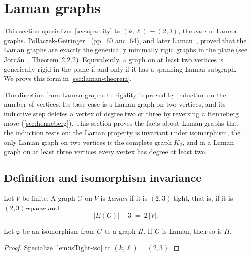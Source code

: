 \section{Laman graphs}
\label{sec:laman}

This section specializes \cref{sec:sparsity} to $(k,\ell) = (2,3)$,
the case of Laman graphs. Pollaczek-Geiringer~\cite{pollaczekGeiringer1927}
(pp.~60 and~64), and later Laman~\cite{laman1970}, proved that the Laman
graphs are exactly the generically minimally rigid graphs in the plane
(see Jord\'an~\cite{jordan2016}, Theorem~2.2.2). Equivalently, a graph
on at least two vertices is generically rigid in the plane if and only
if it has a spanning Laman subgraph. We prove this form in
\cref{sec:laman-theorem}.

The direction from Laman graphs to rigidity is proved by induction on
the number of vertices. Its base case is a Laman graph on two vertices,
and its inductive step deletes a vertex of degree two or three by
reversing a Henneberg move (\cref{sec:henneberg}). This section proves
the facts about Laman graphs that the induction rests on: the Laman
property is invariant under isomorphism, the only Laman graph on two
vertices is the complete graph $K_2$, and in a Laman graph on at least
three vertices every vertex has degree at least two.

\subsection{Definition and isomorphism invariance}

\begin{definition}
  \label{def:isLaman}
  \leanok
  Let $V$ be finite. A graph $G$ on $V$ is \emph{Laman} if it is
  $(2,3)$-tight, that is, if it is $(2,3)$-sparse and
  \[
    |E(G)| + 3 \;=\; 2\,|V|.
  \]
\end{definition}

\begin{lemma}
  \label{lem:isLaman-iso}
  \leanok
  Let $\varphi$ be an isomorphism from $G$ to a graph $H$. If $G$ is
  Laman, then so is $H$.
\end{lemma}
\begin{proof}
  \leanok
  Specialize \cref{lem:isTight-iso} to $(k, \ell) = (2, 3)$.
\end{proof}

